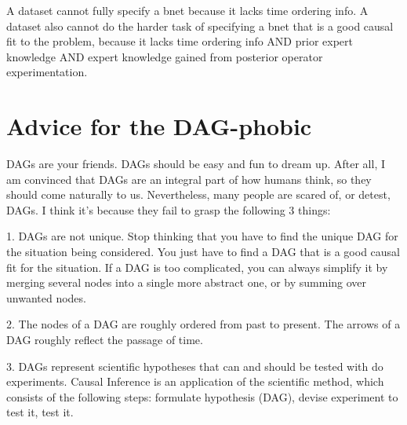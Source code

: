 A dataset cannot fully specify a
bnet because it lacks time ordering info. A dataset also cannot do the harder
task of specifying a bnet that is a good causal fit to the problem, because
it lacks time ordering info AND prior expert knowledge AND expert knowledge
gained from posterior  operator experimentation.

\section{Advice for the DAG-phobic}
\label{sec-advice-dagophobic}

DAGs are your friends. DAGs should be easy and fun to dream up. After all, I
am convinced that DAGs are an integral part of how humans think, so they
should come naturally to us.  Nevertheless, many people are scared of, or
detest, DAGs. I think it’s because they fail to grasp the following 3 things:

1. DAGs are not unique. Stop thinking that you have to find the unique DAG
for the situation being considered. You just have to find a DAG that is a
good causal fit for the situation. If a DAG is too complicated, you can
always simplify it by merging several nodes into a single more abstract one,
or by summing over unwanted nodes.

2. The nodes of a DAG are roughly ordered from past to present. The arrows of a DAG roughly
reflect the passage of time.

3. DAGs represent scientific hypotheses that can and should be tested with
do experiments. Causal Inference is an
application of the scientific method, which consists
of the following steps:
formulate hypothesis (DAG), devise experiment
to test it, test it.
